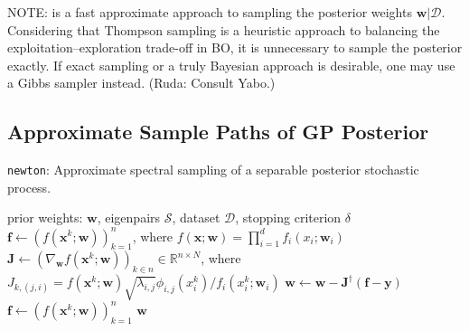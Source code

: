 \documentclass{article}
\newcommand{\cmtR}[1]{\textcolor{red!50!black}{(Ruda: #1)}} %
\begin{document}
NOTE:  is a fast approximate approach to sampling the posterior
weights $\mathbf{w} | \mathcal{D}$. Considering that Thompson sampling
is a heuristic approach to balancing the exploitation--exploration
trade-off in BO, it is unnecessary to sample the posterior exactly. If
exact sampling or a truly Bayesian approach is desirable, one may use a
Gibbs sampler instead. \cmtR{Consult Yabo.}

\subsection{Approximate Sample Paths of GP Posterior}

\begin{algorithm}[h]
  \caption{\texttt{newton}: Approximate spectral sampling
    of a separable posterior stochastic process.}
  \label{alg:newton}
  \begin{algorithmic}[1] %
    \Input prior weights: $\mathbf{w}$, eigenpairs $\mathcal{S}$,
    dataset $\mathcal{D}$, stopping criterion $\delta$
    \State $\mathbf{f} \gets (f(\mathbf{x}^k; \mathbf{w}))_{k=1}^n$, where
    $f(\mathbf{x}; \mathbf{w}) = \prod_{i=1}^d f_i(x_i; \mathbf{w}_i)$
      \State $\mathbf{J} \gets (\nabla_{\mathbf{w}} f(\mathbf{x}^k; \mathbf{w}))_{k \in n}
      \in \mathbb{R}^{n \times N}$, where $J_{k,(j,i)} =
      {f(\mathbf{x}^k; \mathbf{w})} \sqrt{\lambda_{i,j}} \phi_{i,j}(x_i^k) / {f_i(x_i^k; \mathbf{w}_i)}$
      \State $\mathbf{w} \gets \mathbf{w} - \mathbf{J}^\dagger (\mathbf{f} - \mathbf{y})$
      \State $\mathbf{f} \gets (f(\mathbf{x}^k; \mathbf{w}))_{k=1}^n$
    \EndWhile
    \Output $\mathbf{w}$
  \end{algorithmic}
\end{algorithm}
\end{document}
